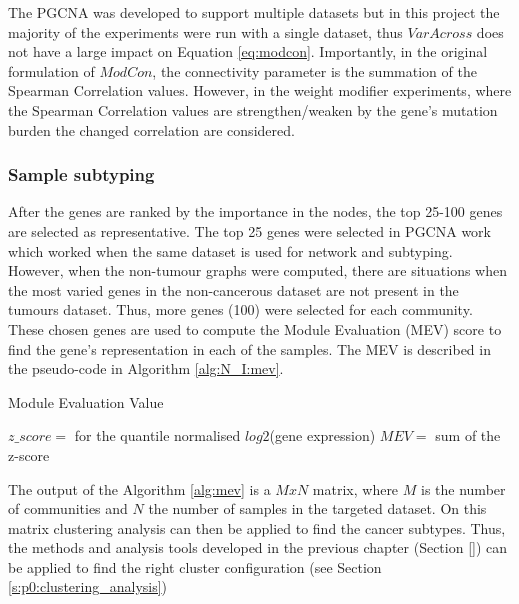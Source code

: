 The PGCNA was developed to support multiple datasets but in this project the majority of the experiments were run with a single dataset, thus $VarAcross$ does not have a large impact on Equation \ref{eq:modcon}. Importantly, in the original formulation of $ModCon$, the connectivity parameter is the summation of the Spearman Correlation values. However, in the weight modifier experiments, where the Spearman Correlation values are strengthen/weaken by the gene's mutation burden the changed correlation are considered.

\subsubsection{Sample subtyping} \label{s:N_I:mev}

After the genes are ranked by the importance in the nodes, the top 25-100 genes are selected as representative. The top 25 genes were selected in PGCNA work \cite{Care2019-ij} which worked when the same dataset is used for network and subtyping. However, when the non-tumour graphs were computed, there are situations when the most varied genes in the non-cancerous dataset are not present in the tumours dataset. Thus, more genes (100) were selected for each community. These chosen genes are used to compute the Module Evaluation (MEV) score \citet{Care2019-ij} to find the gene's representation in each of the samples. The MEV is described in the pseudo-code in Algorithm \ref{alg:N_I:mev}.

\begin{algorithm}
\caption{Module Evaluation Value }\label{alg:N_I:mev}
    \begin{algorithmic}
            \State $z\_score=$ for the quantile normalised $log2$(gene expression)
                \State $MEV=$ sum of the z-score  
            \EndFor
        \EndFor
    \EndFor
    \end{algorithmic}
\end{algorithm}

The output of the Algorithm \ref{alg:mev} is a $MxN$ matrix, where $M$ is the number of communities and $N$ the number of samples in the targeted dataset. On this matrix clustering analysis can then be applied to find the cancer subtypes. Thus, the methods and analysis tools developed in the previous chapter (Section \ref{}) can be applied to find the right cluster configuration (see Section \ref{s:p0:clustering_analysis})
